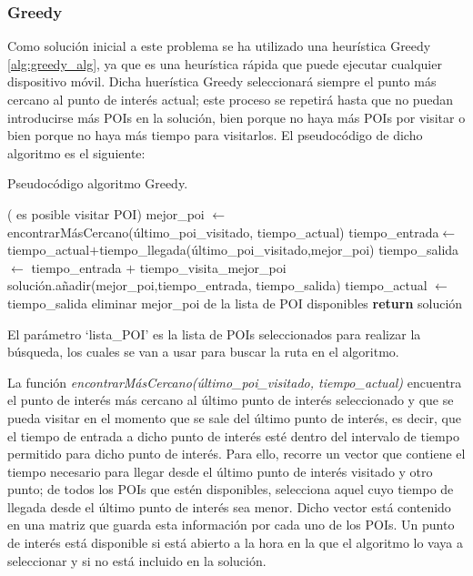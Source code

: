 \subsubsection{Greedy}
Como solución inicial a este problema se ha utilizado una heurística Greedy \ref{alg:greedy_alg}, ya que es una heurística rápida que puede ejecutar cualquier dispositivo móvil. Dicha huerística Greedy seleccionará siempre el punto más cercano al punto de interés actual; este proceso se repetirá hasta que no puedan introducirse más POIs en la solución, bien porque no haya más POIs por visitar o bien porque no haya más tiempo para visitarlos. El pseudocódigo de dicho algoritmo es el siguiente:\newline
\begin{algorithm}[H]
	\caption{Pseudocódigo algoritmo Greedy.}
	\label{alg:greedy_alg}
	\begin{algorithmic}
		\While( es posible visitar POI)
		\State mejor\_poi $\gets$ encontrarMásCercano(último\_poi\_visitado, tiempo\_actual) 
		\State tiempo\_entrada$\gets$tiempo\_actual$+$tiempo\_llegada(último\_poi\_visitado,mejor\_poi)
		\State tiempo\_salida $\gets$ tiempo\_entrada $+$ tiempo\_visita\_mejor\_poi
		\State solución.añadir(mejor\_poi,tiempo\_entrada, tiempo\_salida)
		\State tiempo\_actual $\gets$ tiempo\_salida
		\State eliminar mejor\_poi de la lista de POI disponibles
		\EndWhile
		\State \textbf{return} solución
		\EndFunction
	\end{algorithmic}
\end{algorithm}
\vspace{0.06in}
El parámetro \enquote*{lista\_POI} es la lista de POIs seleccionados para realizar la búsqueda, los cuales se van a usar para buscar la ruta en el algoritmo.\newline

La función \textit{encontrarMásCercano(último\_poi\_visitado, tiempo\_actual)} encuentra el punto de interés más cercano al último punto de interés seleccionado y que se pueda visitar en el momento que se sale del último punto de interés, es decir, que el tiempo de entrada a dicho punto de interés esté dentro del intervalo de tiempo permitido para dicho punto de interés. Para ello, recorre un vector que contiene el tiempo necesario para llegar desde el último punto de interés visitado y otro punto; de todos los POIs que estén disponibles, selecciona aquel cuyo tiempo de llegada desde el último punto de interés sea menor. Dicho vector está contenido en una matriz que guarda esta información por cada uno de los POIs. Un punto de interés está disponible si está abierto a la hora en la que el algoritmo lo vaya a seleccionar y si no está incluido en la solución.\newline

